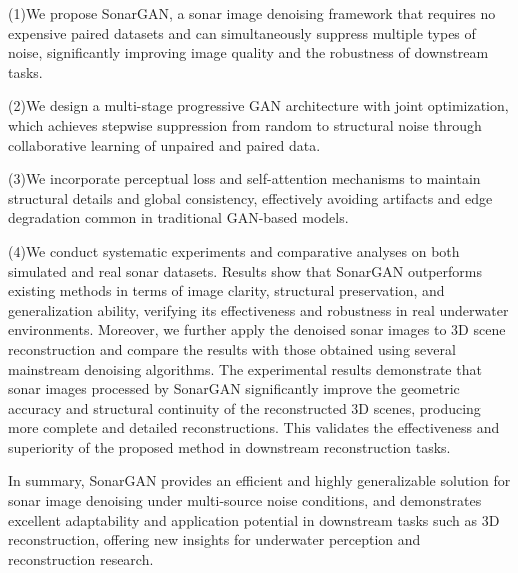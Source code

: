 \begin{eabstract}
(1)We propose SonarGAN, a sonar image denoising framework that requires no expensive paired datasets and can simultaneously suppress multiple types of noise, significantly improving image quality and the robustness of downstream tasks.

(2)We design a multi-stage progressive GAN architecture with joint optimization, which achieves stepwise suppression from random to structural noise through collaborative learning of unpaired and paired data.

(3)We incorporate perceptual loss and self-attention mechanisms to maintain structural details and global consistency, effectively avoiding artifacts and edge degradation common in traditional GAN-based models.

(4)We conduct systematic experiments and comparative analyses on both simulated and real sonar datasets. Results show that SonarGAN outperforms 
existing methods in terms of image clarity, structural preservation, and generalization ability, verifying its effectiveness and robustness 
in real underwater environments. Moreover, we further apply the denoised sonar images to 3D scene reconstruction and compare the results with 
those obtained using several mainstream denoising algorithms. The experimental results demonstrate that sonar images processed by SonarGAN 
significantly improve the geometric accuracy and structural continuity of the reconstructed 3D scenes, producing more complete and detailed 
reconstructions. This validates the effectiveness and superiority of the proposed method in downstream reconstruction tasks.

In summary, SonarGAN provides an efficient and highly generalizable solution for sonar image denoising under multi-source noise conditions, 
and demonstrates excellent adaptability and application potential in downstream tasks such as 3D reconstruction, offering new insights for 
underwater perception and reconstruction research.

\end{eabstract}
